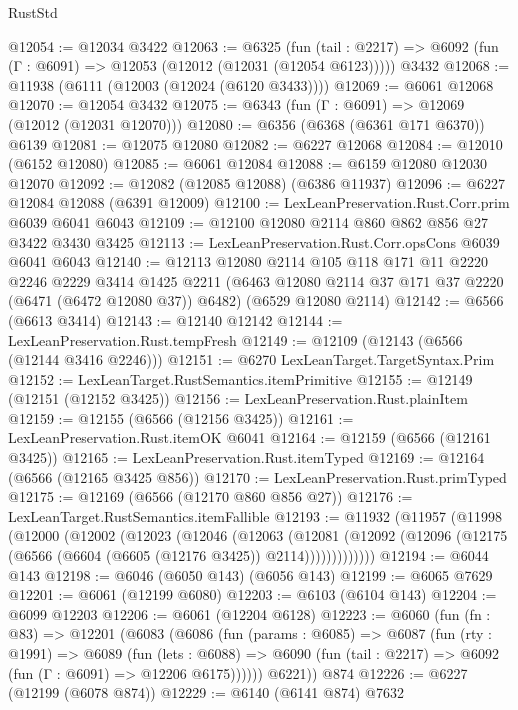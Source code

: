 \begin{lexlean}{RustStd}
\begin{coremodule}
@12054 := @12034 @3422
@12063 := @6325
    (fun (tail : @2217) => @6092 (fun (Γ : @6091) => @12053 (@12012 (@12031 (@12054 @6123)))))
    @3432
@12068 := @11938 (@6111 (@12003 (@12024 (@6120 @3433))))
@12069 := @6061 @12068
@12070 := @12054 @3432
@12075 := @6343 (fun (Γ : @6091) => @12069 (@12012 (@12031 @12070)))
@12080 := @6356 (@6368 (@6361 @171 @6370)) @6139
@12081 := @12075 @12080
@12082 := @6227 @12068
@12084 := @12010 (@6152 @12080)
@12085 := @6061 @12084
@12088 := @6159 @12080 @12030 @12070
@12092 := @12082 (@12085 @12088) (@6386 @11937)
@12096 := @6227 @12084 @12088 (@6391 @12009)
@12100 := LexLeanPreservation.Rust.Corr.prim @6039 @6041 @6043
@12109 := @12100 @12080 @2114 @860 @862 @856 @27 @3422 @3430 @3425
@12113 := LexLeanPreservation.Rust.Corr.opsCons @6039 @6041 @6043
@12140 := @12113
    @12080
    @2114
    @105
    @118
    @171
    @11
    @2220
    @2246
    @2229
    @3414
    @1425
    @2211
    (@6463 @12080 @2114 @37 @171 @37 @2220 (@6471 (@6472 @12080 @37)) @6482)
    (@6529 @12080 @2114)
@12142 := @6566 (@6613 @3414)
@12143 := @12140 @12142
@12144 := LexLeanPreservation.Rust.tempFresh
@12149 := @12109 (@12143 (@6566 (@12144 @3416 @2246)))
@12151 := @6270 LexLeanTarget.TargetSyntax.Prim
@12152 := LexLeanTarget.RustSemantics.itemPrimitive
@12155 := @12149 (@12151 (@12152 @3425))
@12156 := LexLeanPreservation.Rust.plainItem
@12159 := @12155 (@6566 (@12156 @3425))
@12161 := LexLeanPreservation.Rust.itemOK @6041
@12164 := @12159 (@6566 (@12161 @3425))
@12165 := LexLeanPreservation.Rust.itemTyped
@12169 := @12164 (@6566 (@12165 @3425 @856))
@12170 := LexLeanPreservation.Rust.primTyped
@12175 := @12169 (@6566 (@12170 @860 @856 @27))
@12176 := LexLeanTarget.RustSemantics.itemFallible
@12193 := @11932
    (@11957
      (@11998
        (@12000
          (@12002
            (@12023
              (@12046
                (@12063
                  (@12081
                    (@12092 (@12096 (@12175 (@6566 (@6604 (@6605 (@12176 @3425)) @2114)))))))))))))
@12194 := @6044 @143
@12198 := @6046 (@6050 @143) (@6056 @143)
@12199 := @6065 @7629
@12201 := @6061 (@12199 @6080)
@12203 := @6103 (@6104 @143)
@12204 := @6099 @12203
@12206 := @6061 (@12204 @6128)
@12223 := @6060
    (fun (fn : @83) =>
    @12201
      (@6083
        (@6086
          (fun (params : @6085) =>
          @6087
            (fun (rty : @1991) =>
            @6089
              (fun (lets : @6088) =>
              @6090 (fun (tail : @2217) => @6092 (fun (Γ : @6091) => @12206 @6175))))))
        @6221))
    @874
@12226 := @6227 (@12199 (@6078 @874))
@12229 := @6140 (@6141 @874) @7632

\end{coremodule}
\end{lexlean}
